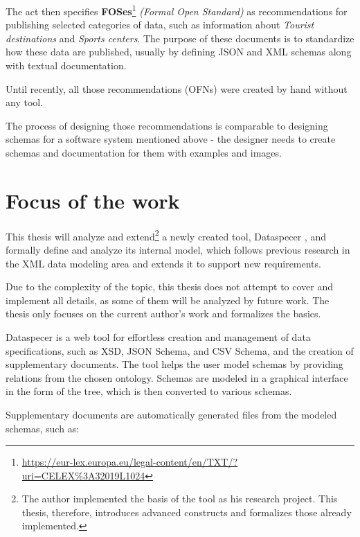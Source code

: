 The act then specifies \textbf{FOSes}\footnote{\url{https://eur-lex.europa.eu/legal-content/en/TXT/?uri=CELEX\%3A32019L1024}} \textit{(Formal Open Standard)} as recommendations for publishing selected categories of data, such as information about \textit{Tourist destinations} and \textit{Sports centers}. The purpose of these documents is to standardize how these data are published, usually by defining JSON and XML schemas along with textual documentation.

Until recently, all those recommendations (OFNs) were created by hand without any tool.

\smallskip

The process of designing those recommendations is comparable to designing schemas for a software system mentioned above - the designer needs to create schemas and documentation for them with examples and images.

\section*{Focus of the work}

This thesis will analyze and extend\footnote{The author implemented the basis of the tool as his research project. This thesis, therefore, introduces advanced constructs and formalizes those already implemented.} a newly created tool, Dataspecer \cite{dataspecer}, and formally define and analyze its internal model, which follows previous research in the XML data modeling area and extends it to support new requirements.

Due to the complexity of the topic, this thesis does not attempt to cover and implement all details, as some of them will be analyzed by future work. The thesis only focuses on the current author's work and formalizes the basics.

Dataspecer is a web tool for effortless creation and management of data specifications, such as XSD, JSON Schema, and CSV Schema, and the creation of supplementary documents. The tool helps the user model schemas by providing relations from the chosen ontology. Schemas are modeled in a graphical interface in the form of the tree, which is then converted to various schemas.

Supplementary documents are automatically generated files from the modeled schemas, such as:

